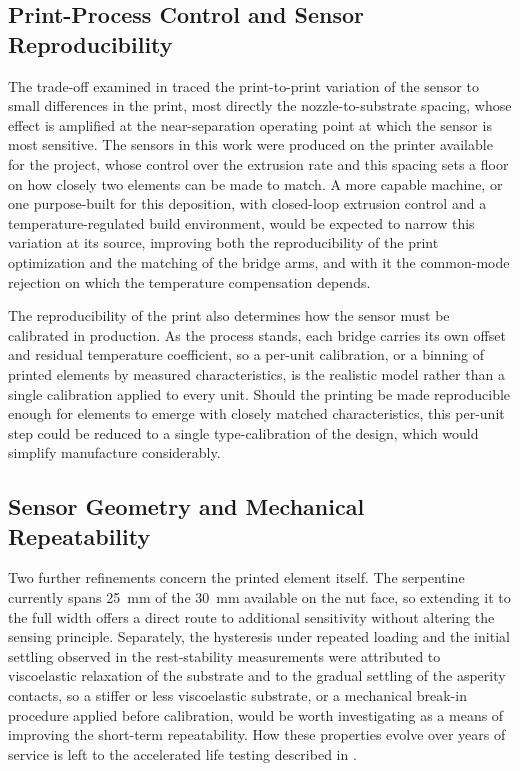 \subsection{Print-Process Control and Sensor Reproducibility}\label{sec:process_control}
The trade-off examined in  traced the print-to-print variation of the sensor to small differences in the print, most directly the nozzle-to-substrate spacing, whose effect is amplified at the near-separation operating point at which the sensor is most sensitive. The sensors in this work were produced on the printer available for the project, whose control over the extrusion rate and this spacing sets a floor on how closely two elements can be made to match. A more capable machine, or one purpose-built for this deposition, with closed-loop extrusion control and a temperature-regulated build environment, would be expected to narrow this variation at its source, improving both the reproducibility of the print optimization and the matching of the bridge arms, and with it the common-mode rejection on which the temperature compensation depends.
 
The reproducibility of the print also determines how the sensor must be calibrated in production. As the process stands, each bridge carries its own offset and residual temperature coefficient, so a per-unit calibration, or a binning of printed elements by measured characteristics, is the realistic model rather than a single calibration applied to every unit. Should the printing be made reproducible enough for elements to emerge with closely matched characteristics, this per-unit step could be reduced to a single type-calibration of the design, which would simplify manufacture considerably.
 
\subsection{Sensor Geometry and Mechanical Repeatability}
Two further refinements concern the printed element itself. The serpentine currently spans \SI{25}{\milli\meter} of the \SI{30}{\milli\meter} available on the nut face, so extending it to the full width offers a direct route to additional sensitivity without altering the sensing principle. Separately, the hysteresis under repeated loading and the initial settling observed in the rest-stability measurements were attributed to viscoelastic relaxation of the substrate and to the gradual settling of the asperity contacts, so a stiffer or less viscoelastic substrate, or a mechanical break-in procedure applied before calibration, would be worth investigating as a means of improving the short-term repeatability. How these properties evolve over years of service is left to the accelerated life testing described in .

